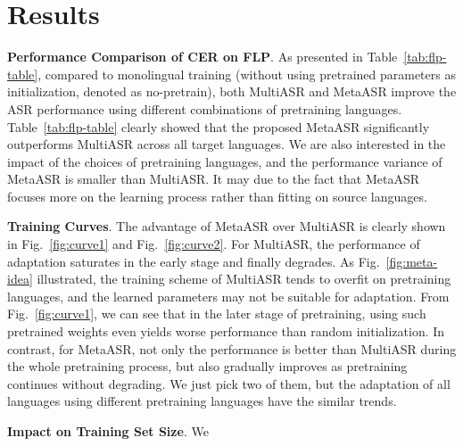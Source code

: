 \section{Results}
\label{sec:results}

\label{ssec:multitask-baseline}

\textbf{Performance Comparison of CER on FLP}. As presented in Table~\ref{tab:flp-table}, compared to monolingual training (without using pretrained parameters as initialization, denoted as no-pretrain), both MultiASR and MetaASR improve the ASR performance using different combinations of pretraining languages. Table~\ref{tab:flp-table} clearly showed that the proposed MetaASR significantly outperforms MultiASR across all target languages. We are also interested in the impact of the choices of pretraining languages, and the performance variance of MetaASR is smaller than MultiASR. It may due to the fact that MetaASR focuses more on the learning process rather than fitting on source languages. 





\noindent
\textbf{Training Curves}. The advantage of MetaASR over MultiASR is clearly shown in Fig.~\ref{fig:curve1} and Fig.~\ref{fig:curve2}. For MultiASR, the performance of adaptation saturates in the early stage and finally degrades.  As Fig.~\ref{fig:meta-idea} illustrated, the training scheme of MultiASR tends to overfit on pretraining languages, and the learned parameters may not be suitable for adaptation. From Fig.~\ref{fig:curve1}, we can see that in the later stage of pretraining, using such pretrained weights even yields worse performance than random initialization. In contrast, for MetaASR, not only the performance is better than MultiASR during the whole pretraining process, but also gradually improves as pretraining continues without degrading. We just pick two of them, but the adaptation of all languages using different pretraining languages have the similar trends.


\noindent
\textbf{Impact on Training Set Size}. We  %
